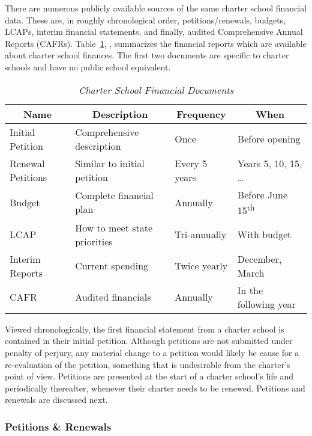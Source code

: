 There are numerous publicly available sources of the same charter school financial data. These are, in roughly chronological order, petitions/renewals, budgets, LCAPs,  interim financial statements, and finally, audited Comprehensive Annual Reports (CAFRs). Table~\ref{tab:charter-fin-docs},  , summarizes the financial reports which are available about charter school finances. The first two documents are specific to charter schools and have no public school equivalent.

\begin{table}[hb]
  \centering\small%
  \caption[Charter School Financial Documents]{\textit{Charter School Financial Documents}}\label{tab:charter-fin-docs}%
  \begin{tabular}{llll}
    \toprule%
    \multicolumn{1}{c}{Name}  & \multicolumn{1}{c}{Description} & \multicolumn{1}{c}{Frequency} & \multicolumn{1}{c}{When} \\
    \midrule%
    Initial Petition  & Comprehensive description    & Once          & Before opening \\
    Renewal Petitions & Similar to initial petition  & Every 5 years & Years 5, 10, 15, \ldots \\
    Budget            & Complete financial plan      & Annually      & Before June 15\textsuperscript{th} \\
    LCAP              & How to meet state priorities & Tri-annually  & With budget\\
    Interim Reports   & Current spending             & Twice yearly  & December, March \\
    CAFR              & Audited financials           & Annually      & In the following year \\
    \bottomrule%
  \end{tabular}
\end{table}%

Viewed chronologically, the first financial statement from a charter school is contained in their initial petition. Although petitions are not submitted under penalty of perjury, any material change to a petition would likely be cause for a re-evaluation of the petition, something that is undesirable from the charter's point of view. Petitions are presented at the start of a charter school's life and periodically thereafter, whenever their charter needs to be renewed. Petitions and renewals are discussed next.

\subsubsection{Petitions \& Renewals}\indent

